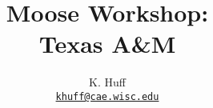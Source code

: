 \documentclass[letterpaper]{article}
\author{K. Huff
  \\ \href{mailto:khuff@cae.wisc.edu}{\texttt{khuff@cae.wisc.edu}}
}
\date{}
\title{Moose Workshop:\\
Texas A\&M}
\begin{document}
\maketitle



\pagebreak


\end{document}
